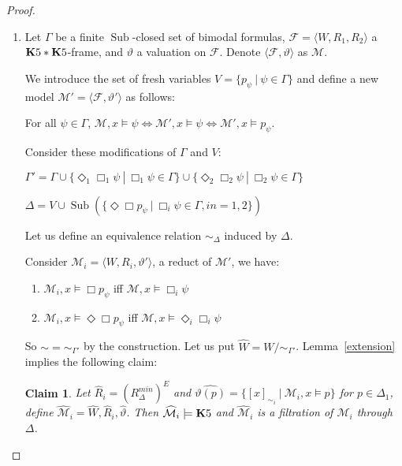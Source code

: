 \documentclass[a4paper]{article}
\theoremstyle{defin}
\theoremstyle{theorem}
\theoremstyle{prop}
\theoremstyle{lemma}
\theoremstyle{fact}
\theoremstyle{exercise}
\theoremstyle{ex}
\theoremstyle{col}
\theoremstyle{claim}
\newtheorem{claim}{Claim}
\begin{document}
\begin{proof}
$ $

  \begin{enumerate}
  \item Let $\Gamma$ be a finite $\operatorname{Sub}$-closed set of bimodal formulas,
  $\mathcal{F} = \langle W, R_1, R_2 \rangle$ a ${\bf K}5 * {\bf K}5$-frame, and $\vartheta$ a valuation on $\mathcal{F}$. Denote $\langle \mathcal{F}, \vartheta \rangle$ as $\mathcal{M}$.

  We introduce the set of fresh variables $V = \{ p_{\psi} \: | \: \psi \in \Gamma \}$ and define a new model $\mathcal{M}' = \langle \mathcal{F}, \vartheta' \rangle$ as follows:
  \begin{center}
    For all $\psi \in \Gamma$, $\mathcal{M}, x \models \psi \Leftrightarrow \mathcal{M}', x \models \psi \Leftrightarrow \mathcal{M}', x \models p_{\psi}$.
  \end{center}

  Consider these modifications of $\Gamma$ and $V$:

  \begin{center}
    $\Gamma' = \Gamma \cup \{ \Diamond_1 \Box_1 \psi \: | \: \Box_1 \psi \in \Gamma \} \cup \{ \Diamond_2 \Box_2 \psi \: | \: \Box_2 \psi \in \Gamma \}$

    $\Delta = V \cup \operatorname{Sub}(\{ \Diamond \Box p_{\psi} \: | \: \Box_i \psi \in \Gamma, i n= 1,2 \})$
  \end{center}
  Let us define an equivalence relation $\sim_{\Delta}$ induced by $\Delta$.

  Consider $\mathcal{M}_i = \langle W, R_i, \vartheta' \rangle$, a reduct of $\mathcal{M}'$, we have:
  \begin{enumerate}
    \item $\mathcal{M}_i, x \models \Box p_{\psi}$ iff $\mathcal{M}, x \models \Box_i \psi$
    \item $\mathcal{M}_i, x \models \Diamond \Box p_{\psi}$ iff $\mathcal{M}, x \models \Diamond_i \Box_i \psi$
  \end{enumerate}
  So $\sim = \sim_{\Gamma'}$ by the construction. Let us put $\widehat{W} = W / \sim_{\Gamma'}$. Lemma~\ref{extension} implies the following claim:

  \begin{claim}
    Let $\widehat{R}_i = (R^{min}_{\Delta})^{E}$ and
    $\widehat{\vartheta(p)} = \{ [x]_{\sim_i} \: | \: \mathcal{M}_i, x \models p \}$ for $p \in \Delta_1$, define $\widehat{\mathcal{M}}_i = \widehat{W}, \widehat{R}_i, \widehat{\vartheta}$. Then $\widehat{\mathcal{M}}_i \models {\bf K}5$ and $\widehat{\mathcal{M}}_i$ is a filtration of $\mathcal{M}_i$ through $\Delta$.
  \end{claim}


\end{enumerate}
\end{proof}
\end{document}
